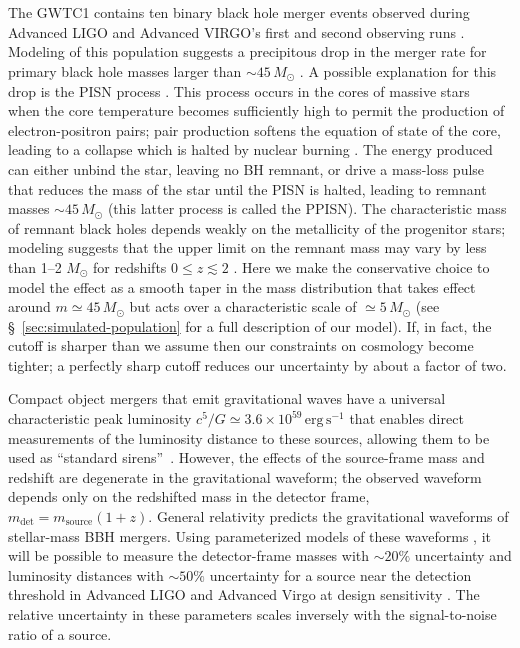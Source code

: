 \documentclass[modern]{aastex62}
\newcommand{\MPISN}{45 \, \MSun{}}
\newcommand{\MTaperScale}{5 \, \MSun{}}
\newcommand{\MSun}{M_\odot}
\begin{document}
\section*{ }

The \ac{GWTC1} contains ten binary black hole merger events observed during
Advanced LIGO and Advanced VIRGO's first and second observing runs
\citep{GWTC-1}. Modeling of this population suggests a precipitous drop in the
merger rate for primary black hole masses larger than $\sim \MPISN{}$
\citep{Fishbach2017,GWTC-1}.  A possible explanation for this drop is the
\ac{PISN} process
\citep{Fowler1964,Rakavy1967,Bond1984,Heger2002,Belczynski2016,Woosley2017,Spera2017,Leung2019}.
This process occurs in the cores of massive stars~\citep[helium core masses $30$--$133
\, \MSun$;][]{Woosley2017} when the core temperature becomes sufficiently
high to permit the production of electron-positron pairs; pair production
softens the equation of state of the core, leading to a collapse which is halted
by nuclear burning \citep{Heger2002}.  The energy produced can either unbind the
star, leaving no \ac{BH} remnant, or drive a mass-loss pulse that reduces the
mass of the star until the \ac{PISN} is halted, leading to remnant masses $\sim
\MPISN{}$ (this latter process is called the \ac{PPISN}). The characteristic
mass of remnant black holes depends weakly on the metallicity of the progenitor
stars; modeling suggests that the upper limit on the remnant mass may vary by
less than 1--2 $\MSun$ for redshifts $0 \leq z \lesssim 2$
\citep{Belczynski2016,Mapelli2017}.  Here we make the conservative choice to
model the effect as a smooth taper in the mass distribution that takes effect
around $m \simeq \MPISN{}$ but acts over a characteristic scale of $\simeq
\MTaperScale$ (see \S\ \ref{sec:simulated-population} for a full description of
our model).  If, in fact, the cutoff is sharper than we assume then our
constraints on cosmology become tighter; a perfectly sharp cutoff reduces our
uncertainty by about a factor of two.

Compact object mergers that emit gravitational waves have a universal
characteristic peak luminosity $c^5/G \simeq 3.6 \times 10^{59} \, \mathrm{erg}
\, \mathrm{s}^{-1}$ that enables direct measurements of the luminosity distance
to these sources, allowing them to be used as ``standard sirens''~\citep{Schutz1986,Holz2005}.
However, the effects of the source-frame mass and redshift are
degenerate in the gravitational waveform; the observed waveform depends only on
the redshifted mass in the detector frame, $m_\mathrm{det} = m_\mathrm{source}
(1 + z)$. General relativity predicts the gravitational waveforms of
stellar-mass \ac{BBH} mergers.  Using parameterized models of these waveforms
\citep{Taracchini2014,Kahn2016,Bohe2017,Chatziioannou2017}, it will be possible
to measure the detector-frame masses with $\sim 20\%$ uncertainty and luminosity
distances \citep{Hogg1999} with $\sim 50\%$ uncertainty for a source near the
detection threshold in Advanced LIGO and Advanced Virgo at design sensitivity
\citep{Vitale2017}.  The relative uncertainty in these parameters scales
inversely with the signal-to-noise ratio of a source.
\end{document}
